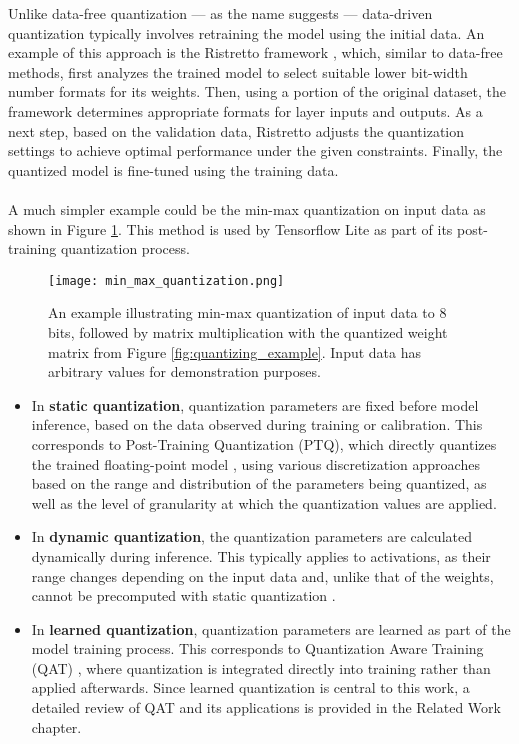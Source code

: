 \noindent Unlike data-free quantization  —  as the name suggests — data-driven quantization typically involves retraining the model
using the initial data. An example of this approach is the Ristretto framework \cite{DBLP:journals/tnn/GyselPMG18}, which, similar to data-free methods, 
first analyzes the trained model to select suitable lower bit-width number formats for its weights.
Then, using a portion of the original dataset, the framework determines appropriate formats for layer inputs and outputs.
As a next step, based on the validation data, Ristretto adjusts the quantization settings to achieve optimal performance 
under the given constraints. Finally, the quantized model is fine-tuned using the training data.
\\
\\
A much simpler example could be the min-max quantization on input data as shown in Figure \ref{fig:min_max_quantization}. 
This method is used by Tensorflow Lite as part of its post-training quantization process.

\begin{figure}[h!]
  \centering
  \texttt{[image: min\_max\_quantization.png]}
  \caption{ An example illustrating min-max quantization of input data to 8 bits, followed by matrix multiplication with the quantized weight matrix from Figure \ref{fig:quantizing_example}.
  Input data has arbitrary values for demonstration purposes.}
  \label{fig:min_max_quantization}
\end{figure}

    \begin{itemize}
        \item In \textbf{static quantization}, quantization parameters are fixed before model inference, based on the data observed during training or calibration.
        This corresponds to Post-Training Quantization (PTQ), which directly quantizes the trained floating-point model \cite{jiang2021efficient}, 
        using various discretization approaches based on the range and distribution of the parameters being quantized, 
        as well as the level of granularity at which the quantization values are applied.
        
        \item In \textbf{dynamic quantization}, the quantization parameters are calculated dynamically during inference. 
        This typically applies to activations, as their range changes depending on the input data and, unlike that of the weights, 
        cannot be precomputed with static quantization \cite{kim2021ibert}.
        
        \item In \textbf{learned quantization}, quantization parameters are learned as part of the model training process.
        This corresponds to Quantization Aware Training (QAT) \cite{jacob2018quantization}, where quantization is integrated directly into training rather than applied afterwards.
        Since learned quantization is central to this work, a detailed review of QAT and its applications is provided in the Related Work chapter. 

    \end{itemize}

